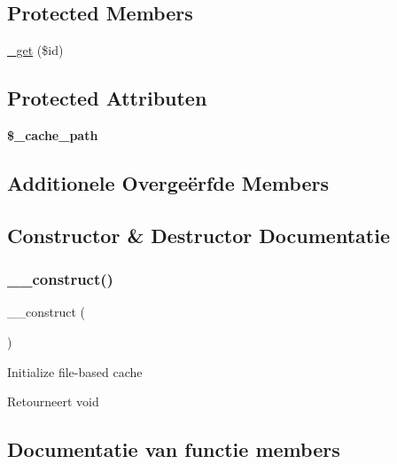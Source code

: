 \subsection*{Protected Members}
\begin{DoxyCompactItemize}
\item 
\mbox{\hyperlink{class_c_i___cache__file_aae09ed79c1d2dc8b2093602181ddf911}{\+\_\+get}} (\$id)
\end{DoxyCompactItemize}
\subsection*{Protected Attributen}
\begin{DoxyCompactItemize}
\item 
\mbox{\label{class_c_i___cache__file_ae9407d6ae1ddd132cca3c7f855f89dfe}} 
{\bfseries \$\+\_\+cache\+\_\+path}
\end{DoxyCompactItemize}
\subsection*{Additionele Overge\"{e}rfde Members}


\subsection{Constructor \& Destructor Documentatie}
\mbox{\label{class_c_i___cache__file_a095c5d389db211932136b53f25f39685}} 
\subsubsection{\texorpdfstring{\_\_construct()}{\_\_construct()}}
{\footnotesize\ttfamily \+\_\+\+\_\+construct (\begin{DoxyParamCaption}{ }\end{DoxyParamCaption})}

Initialize file-\/based cache

\begin{DoxyReturn}{Retourneert}
void 
\end{DoxyReturn}


\subsection{Documentatie van functie members}
\mbox{\label{class_c_i___cache__file_aae09ed79c1d2dc8b2093602181ddf911}} 
